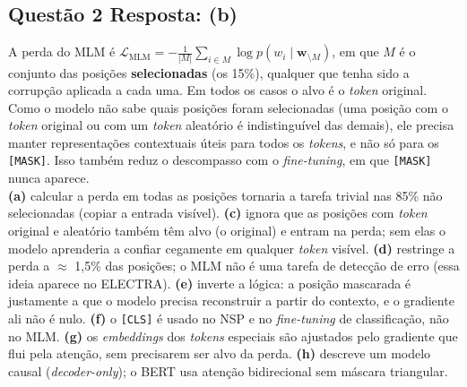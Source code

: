 \documentclass[11pt,a4paper]{article}
\begin{document}
\subsection*{Questão 2 \textemdash{} Resposta: (b)}
A perda do MLM é $\mathcal{L}_{\text{MLM}} = -\frac{1}{|M|}\sum_{i \in M} \log p(w_i \mid \mathbf{w}_{\setminus M})$, em que $M$ é o conjunto das posições \textbf{selecionadas} (os 15\%), qualquer que tenha sido a corrupção aplicada a cada uma. Em todos os casos o alvo é o \textit{token} original. Como o modelo não sabe quais posições foram selecionadas (uma posição com o \textit{token} original ou com um \textit{token} aleatório é indistinguível das demais), ele precisa manter representações contextuais úteis para todos os \textit{tokens}, e não só para os \texttt{[MASK]}. Isso também reduz o descompasso com o \textit{fine-tuning}, em que \texttt{[MASK]} nunca aparece.\\
\textbf{(a)} calcular a perda em todas as posições tornaria a tarefa trivial nas 85\% não selecionadas (copiar a entrada visível).
\textbf{(c)} ignora que as posições com \textit{token} original e aleatório também têm alvo (o original) e entram na perda; sem elas o modelo aprenderia a confiar cegamente em qualquer \textit{token} visível.
\textbf{(d)} restringe a perda a $\approx$ 1{,}5\% das posições; o MLM não é uma tarefa de detecção de erro (essa ideia aparece no ELECTRA).
\textbf{(e)} inverte a lógica: a posição mascarada é justamente a que o modelo precisa reconstruir a partir do contexto, e o gradiente ali não é nulo.
\textbf{(f)} o \texttt{[CLS]} é usado no NSP e no \textit{fine-tuning} de classificação, não no MLM.
\textbf{(g)} os \textit{embeddings} dos \textit{tokens} especiais são ajustados pelo gradiente que flui pela atenção, sem precisarem ser alvo da perda.
\textbf{(h)} descreve um modelo causal (\textit{decoder-only}); o BERT usa atenção bidirecional sem máscara triangular.
\end{document}
